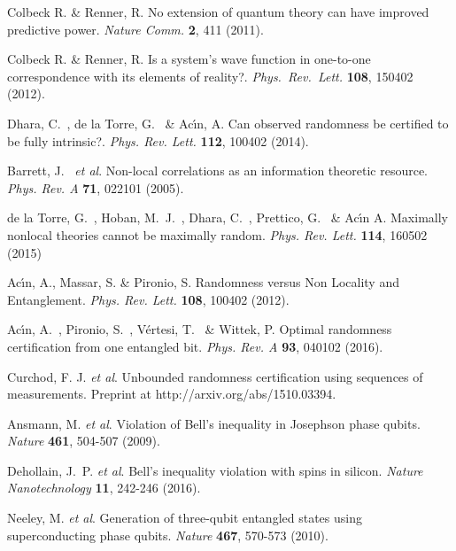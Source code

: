 \documentclass[11pt,a4paper]{article}
\begin{document}
{\begin{thebibliography}{99}
Colbeck R. \& Renner, R. No extension of quantum theory can have improved predictive power. \textit{Nature Comm.} \textbf{2}, 411 (2011).

Colbeck R. \& Renner, R. Is a system's wave function in one-to-one correspondence with its elements of reality?. \textit{Phys.~Rev.~Lett.} \textbf{108}, 150402 (2012).

Dhara, C.~, de la Torre, G.~ \&  Ac\'\i n, A. Can observed randomness be certified to be fully intrinsic?. \textit{Phys. Rev. Lett.} \textbf{112}, 100402 (2014).

Barrett, J.~ {\em et al}.
Non-local correlations as an information theoretic resource. \textit{Phys. Rev. A} \textbf{71}, 022101 (2005).

de la Torre, G.~, Hoban, M.~J.~, Dhara, C.~, Prettico, G.~ \& Ac\'\i n A. Maximally nonlocal theories cannot be maximally random. \textit{Phys. Rev. Lett.} \textbf{114}, 160502 (2015)

Ac\'\i n, A., Massar, S. \& Pironio, S. Randomness versus Non Locality and Entanglement. \textit{Phys. Rev. Lett.} \textbf{108}, 100402 (2012).


Ac\'\i n, A.~, Pironio, S.~, V\'ertesi, T.~ \& Wittek, P. Optimal randomness certification from one entangled bit. \textit{Phys. Rev. A} {\bf 93}, 040102 (2016).


Curchod, F. J.  {\em et al}.
Unbounded randomness certification using sequences of measurements. Preprint at http://arxiv.org/abs/1510.03394.


Ansmann, M. {\it et al}. Violation of Bell's inequality in Josephson phase qubits. \textit{Nature} \textbf{461}, 504-507 (2009).

Dehollain, J.~P. {\it et al}. Bell's inequality violation with spins in silicon. \textit{Nature Nanotechnology} \textbf{11}, 242-246 (2016).

Neeley, M. {\it et al}. Generation of three-qubit entangled states using superconducting phase qubits. \textit{Nature} \textbf{467}, 570-573 (2010).


\end{thebibliography}}
\end{document}
